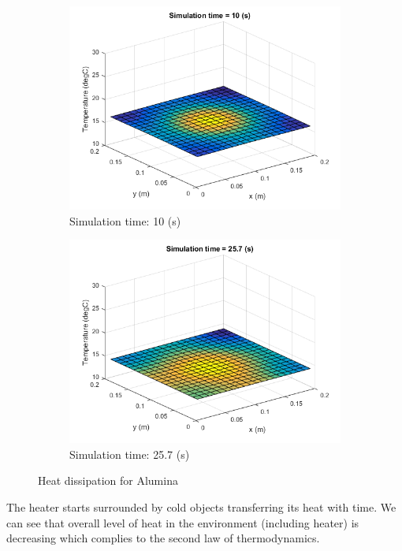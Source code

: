 \documentclass[12pt]{article}
\begin{document}
\begin{figure}[H]
\begin{subfigure}[b]{0.475\textwidth}
		\includegraphics[width=\textwidth]{heat_dissC}
		{{\small Simulation time: 10 (s)}}    
	\end{subfigure}
	\quad
	\begin{subfigure}[b]{0.475\textwidth}   
		\centering 
		\includegraphics[width=\textwidth]{heat_dissD}
		{{\small Simulation time: 25.7 (s)}}    
	\end{subfigure}
	{\small Heat dissipation for Alumina} 
\end{figure}

The heater starts surrounded by cold objects transferring its heat with time. We can see that overall level of heat in the environment (including heater) is decreasing which complies to the second law of thermodynamics. 
\end{document}
